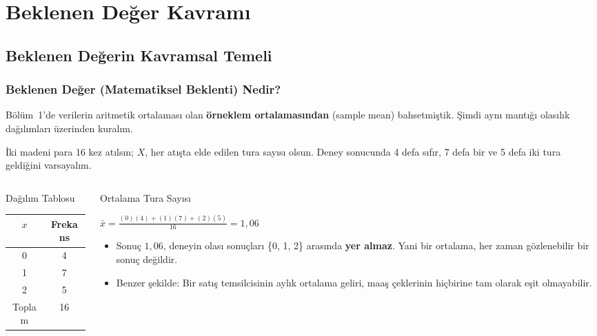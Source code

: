﻿\documentclass[light]{lutbeamer}
\begin{document}
\section{Beklenen Değer Kavramı}
\subsection{Beklenen Değerin Kavramsal Temeli}

\begin{frame}[fragile]
  \frametitle{Beklenen Değer (Matematiksel Beklenti) Nedir?}
  Bölüm~1'de verilerin aritmetik ortalaması olan \textbf{örneklem ortalamasından} (sample mean) bahsetmiştik. Şimdi aynı mantığı olasılık dağılımları üzerinden kuralım.

  \medskip
  İki madeni para 16 kez atılsın; $X$, her atışta elde edilen tura sayısı olsun. Deney sonucunda 4 defa sıfır, 7 defa bir ve 5 defa iki tura geldiğini varsayalım.
  \begin{columns}[T]
    \begin{column}{0.2\textwidth}
      \begin{block}{Dağılım Tablosu}
        \centering
        \scriptsize
        \begin{tabular}{@{}cc@{}}
          \toprule
          $x$ & Frekans \\
          \midrule
          0 & 4 \\
          1 & 7 \\
          2 & 5 \\
          \midrule
          Toplam & 16 \\
          \bottomrule
        \end{tabular}
      \end{block}
    \end{column}
    \begin{column}{0.75\textwidth}
      \begin{exampleblock}{Ortalama Tura Sayısı}
        \begin{center}
          $\bar{x} = \frac{(0)(4) + (1)(7) + (2)(5)}{16} = 1{,}06$
        \end{center}
      \end{exampleblock}
      \begin{itemize}
    \item Sonuç $1{,}06$, deneyin olası sonuçları \{0, 1, 2\} arasında \textbf{yer almaz}. Yani bir ortalama, her zaman gözlenebilir bir sonuç değildir.
    \item Benzer şekilde: Bir satış temsilcisinin aylık ortalama geliri, maaş çeklerinin hiçbirine tam olarak eşit olmayabilir.
  \end{itemize}
    \end{column}
  \end{columns}

\end{frame}
\end{document}
